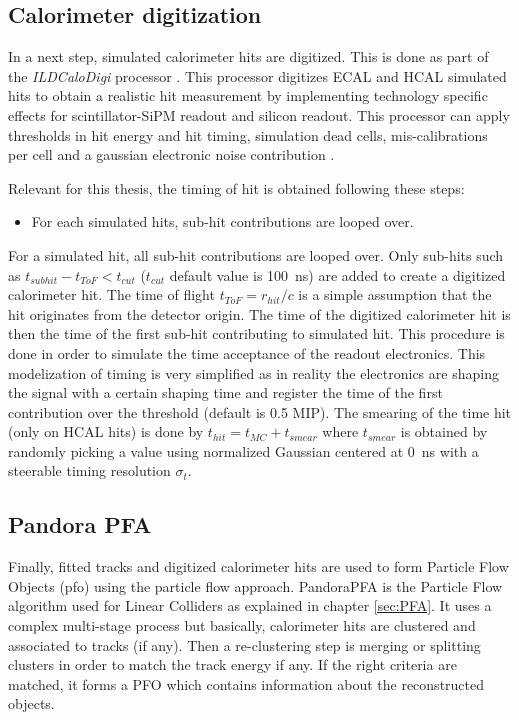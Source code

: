 \subsection{Calorimeter digitization}
\label{subsec:ILDDigiCalo}

In a next step, simulated calorimeter hits are digitized. This is done as part of the \textit{ILDCaloDigi} processor \cite{Jeans2015}. This \marlin processor digitizes ECAL and HCAL simulated hits to obtain a realistic hit measurement by implementing technology specific effects for scintillator-SiPM readout and silicon readout. This processor can apply thresholds in hit energy and hit timing, simulation dead cells, mis-calibrations per cell and a gaussian electronic noise contribution \cite{Hartbrich:2016bbz}.

Relevant for this thesis, the timing of hit is obtained following these steps:
\begin{itemize}
  \item For each simulated hits, sub-hit contributions are looped over. 
\end{itemize}
For a simulated hit, all sub-hit contributions are looped over. Only sub-hits such as $t_{subhit} - t_{ToF} < t_{cut}$ ($t_{cut}$ default value is \SI{100}{\ns}) are added to create a digitized calorimeter hit. The time of flight $t_{ToF} = r_{hit} / c$ is a simple assumption that the hit originates from the detector origin. The time of the digitized calorimeter hit is then the time of the first sub-hit contributing to simulated hit. This procedure is done in order to simulate the time acceptance of the readout electronics. This modelization of timing is very simplified as in reality the electronics are shaping the signal with a certain shaping time and register the time of the first contribution over the threshold (default is 0.5 MIP). The smearing of the time hit (only on HCAL hits) is done by $t_{hit} = t_{MC} + t_{smear}$ where $t_{smear}$ is obtained by randomly picking a value using normalized Gaussian centered at \SI{0}{\nano\second} with a steerable timing resolution $\sigma_{t}$.

\subsection{Pandora PFA}

Finally, fitted tracks and digitized calorimeter hits are used to form Particle Flow Objects (\acrshort{pfo}) using the particle flow approach. PandoraPFA \cite{Thomson:2009rp} is the Particle Flow algorithm used for Linear Colliders as explained in chapter \ref{sec:PFA}. It uses a complex multi-stage process but basically, calorimeter hits are clustered and associated to tracks (if any). Then a re-clustering step is merging or splitting clusters in order to match the track energy if any. If the right criteria are matched, it forms a PFO which contains information about the reconstructed objects.
